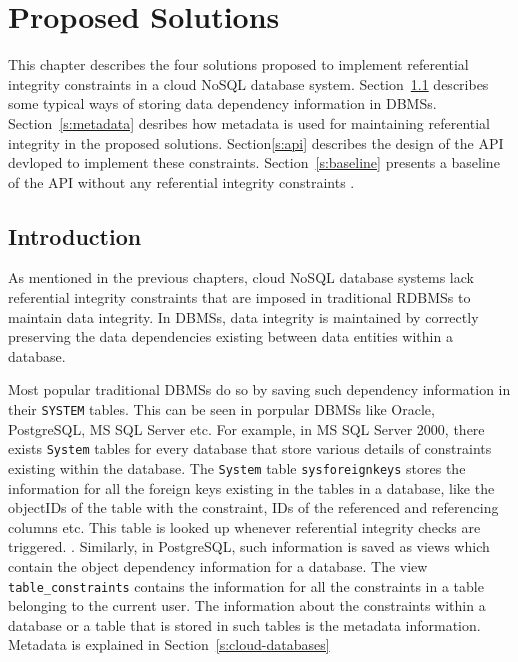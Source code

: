 \chapter{Proposed Solutions} \label{c:solutions}

This chapter describes the four  solutions proposed to implement referential
integrity constraints in a cloud \ac{NoSQL} database system.
Section~\ref{} describes some typical ways of storing  data
dependency information in \acp{DBMS}. Section~\ref{s:metadata} desribes how
metadata is used for maintaining referential integrity in the proposed
solutions. Section\ref{s:api} describes the design of the API devloped to
implement these constraints. Section~\ref{s:baseline} presents a baseline of
the \ac{API} without any referential integrity constraints
.


\section{Introduction}

As mentioned in the previous chapters, cloud \ac{NoSQL} database systems lack
referential integrity constraints that are imposed in traditional \acp{RDBMS} to
maintain data integrity. In \acp{DBMS}, data integrity is maintained by
correctly preserving the data dependencies existing between data entities within
a database.

Most popular traditional \acp{DBMS} do so by saving such dependency information
in their \texttt{SYSTEM} tables. This can be seen in porpular \acp{DBMS} like
Oracle, PostgreSQL, MS SQL Server etc. For example, in MS SQL Server 2000, there
exists \texttt{System} tables for every database that store various details of
constraints existing within the database. The \texttt{System} table
\texttt{sysforeignkeys} stores the information for all the foreign keys existing
in the tables in a database, like the objectIDs of the table with the constraint,
IDs of the referenced and referencing columns etc. This table is looked up
whenever referential integrity checks are triggered. \citep{sys:msdn}.
Similarly, in PostgreSQL, such information is saved as views which contain the
object dependency information for a database. The view
\texttt{table\_constraints} contains the information for all the constraints in
a table belonging to the current user.%
The information about the constraints within a database or a table that is
stored in such tables is the metadata information. Metadata is explained in
 Section~\ref{s:cloud-databases}  

